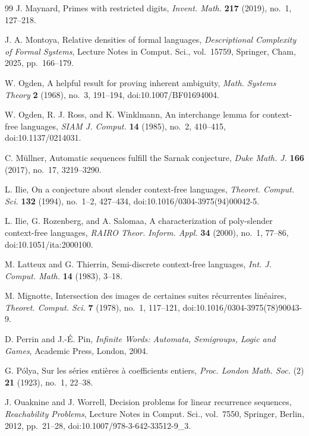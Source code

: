 \begin{thebibliography}{99}
J. Maynard,
Primes with restricted digits,
\textit{Invent. Math.} \textbf{217} (2019), no.~1, 127--218.

J. A. Montoya,
Relative densities of formal languages,
\textit{Descriptional Complexity of Formal Systems},
Lecture Notes in Comput. Sci., vol.~15759, Springer, Cham, 2025,
pp.~166--179.

W. Ogden,
A helpful result for proving inherent ambiguity,
\textit{Math. Systems Theory} \textbf{2} (1968), no.~3, 191--194,
doi:10.1007/BF01694004.

W. Ogden, R. J. Ross, and K. Winklmann,
An interchange lemma for context-free languages,
\textit{SIAM J. Comput.} \textbf{14} (1985), no.~2, 410--415,
doi:10.1137/0214031.

C. M\"ullner,
Automatic sequences fulfill the Sarnak conjecture,
\textit{Duke Math. J.} \textbf{166} (2017), no.~17, 3219--3290.

L. Ilie,
On a conjecture about slender context-free languages,
\textit{Theoret. Comput. Sci.} \textbf{132} (1994), no.~1--2, 427--434,
doi:10.1016/0304-3975(94)00042-5.

L. Ilie, G. Rozenberg, and A. Salomaa,
A characterization of poly-slender context-free languages,
\textit{RAIRO Theor. Inform. Appl.} \textbf{34} (2000), no.~1,
77--86, doi:10.1051/ita:2000100.

M. Latteux and G. Thierrin,
Semi-discrete context-free languages,
\textit{Int. J. Comput. Math.} \textbf{14} (1983), 3--18.

M. Mignotte,
Intersection des images de certaines suites r\'ecurrentes lin\'eaires,
\textit{Theoret. Comput. Sci.} \textbf{7} (1978), no.~1, 117--121,
doi:10.1016/0304-3975(78)90043-9.

D. Perrin and J.-\'E. Pin,
\textit{Infinite Words: Automata, Semigroups, Logic and Games},
Academic Press, London, 2004.

G. P{\'o}lya,
Sur les s{\'e}ries enti{\`e}res {\`a} coefficients entiers,
\textit{Proc. London Math. Soc.} (2) \textbf{21} (1923), no.~1, 22--38.

J. Ouaknine and J. Worrell,
Decision problems for linear recurrence sequences,
\textit{Reachability Problems}, Lecture Notes in Comput. Sci., vol.~7550,
Springer, Berlin, 2012, pp.~21--28,
doi:10.1007/978-3-642-33512-9\_3.


\end{thebibliography}
